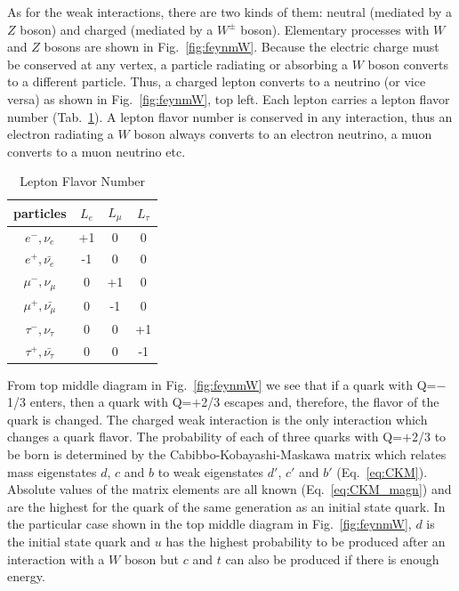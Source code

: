 As for the weak interactions, there are two kinds of them: neutral (mediated by a $Z$ boson) and charged (mediated by a $W^\pm$ boson). Elementary processes with $W$ and $Z$ bosons are shown in Fig.~\ref{fig:feynmW}. Because the electric charge must be conserved at any vertex, a particle radiating or absorbing a $W$ boson converts to a different particle. Thus, a charged lepton converts to a neutrino (or vice versa) as shown in Fig.~\ref{fig:feynmW}, top left. Each lepton carries a lepton flavor number (Tab.~\ref{tab:LeptonFlavorNumber}). A lepton flavor number is conserved in any interaction, thus an electron radiating a $W$ boson  always converts to an electron neutrino, a muon converts to a muon neutrino etc.\\

\begin{table}[h]
  \begin{center}
  \caption{ Lepton Flavor Number}
  \vspace{5 mm}
  \begin{tabular}{|c|c|c|c|}
     \hline
     particles & $L_e$ & $L_{\mu}$ & $L_{\tau}$ \\ \hline
     $e^-,\nu_e$ &  +1  &  0  &  0  \\ \hline 
     $e^+, \bar{\nu_e}$ &  -1  &  0  &  0  \\ \hline 
     $\mu^-,\nu_{\mu}$ &  0  &  +1  &  0  \\ \hline 
     $\mu^+, \bar{\nu_{\mu}}$ &  0  &  -1  &  0  \\ \hline 
     $\tau^-,\nu_{\tau}$ &  0  &  0  &  +1  \\ \hline 
     $\tau^+, \bar{\nu_{\tau}}$ &  0  &  0  &  -1  \\ \hline 
  \end{tabular}
  \label{tab:LeptonFlavorNumber}
  \end{center}
\end{table}

From top middle diagram in Fig.~\ref{fig:feynmW} we see that if a quark with Q=$-$1/3 enters, then a quark with Q=$+$2/3 escapes and, therefore, the flavor of the quark is changed. The charged weak interaction is the only interaction which changes a quark flavor. The probability of each of three quarks with Q=$+$2/3 to be born is determined by the Cabibbo-Kobayashi-Maskawa matrix which relates mass eigenstates $d$, $c$ and $b$ to weak eigenstates $d'$, $c'$ and $b'$ (Eq.~\ref{eq:CKM}). Absolute values of the matrix elements are all known (Eq.~\ref{eq:CKM_magn}) and are the highest for the quark of the same generation as an initial state quark. In the particular case shown in the top middle diagram in Fig.~\ref{fig:feynmW}, $d$ is the initial state quark and $u$ has the highest probability to be produced after an interaction with a $W$ boson but $c$ and $t$ can also be produced if there is enough energy.\\

